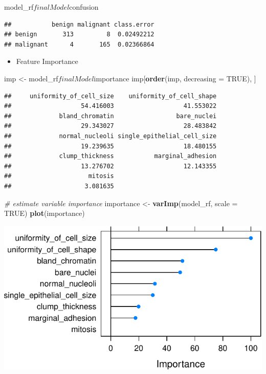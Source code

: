 \documentclass[]{article}
\newenvironment{Shaded}{\begin{snugshade}}{\end{snugshade}}
\newcommand{\KeywordTok}[1]{\textcolor[rgb]{0.13,0.29,0.53}{\textbf{{#1}}}}
\newcommand{\DataTypeTok}[1]{\textcolor[rgb]{0.13,0.29,0.53}{{#1}}}
\newcommand{\StringTok}[1]{\textcolor[rgb]{0.31,0.60,0.02}{{#1}}}
\newcommand{\CommentTok}[1]{\textcolor[rgb]{0.56,0.35,0.01}{\textit{{#1}}}}
\newcommand{\OtherTok}[1]{\textcolor[rgb]{0.56,0.35,0.01}{{#1}}}
\newcommand{\NormalTok}[1]{{#1}}
\providecommand{\tightlist}{%
  \setlength{\itemsep}{0pt}\setlength{\parskip}{0pt}}
\begin{document}
\begin{Shaded}
\begin{Highlighting}[]
\NormalTok{model_rf$finalModel$confusion}
\end{Highlighting}
\end{Shaded}

\begin{verbatim}
##           benign malignant class.error
## benign       313         8  0.02492212
## malignant      4       165  0.02366864
\end{verbatim}

\begin{itemize}
\tightlist
\item
  Feature Importance
\end{itemize}

\begin{Shaded}
\begin{Highlighting}[]
\NormalTok{imp <-}\StringTok{ }\NormalTok{model_rf$finalModel$importance}
\NormalTok{imp[}\KeywordTok{order}\NormalTok{(imp, }\DataTypeTok{decreasing =} \OtherTok{TRUE}\NormalTok{), ]}
\end{Highlighting}
\end{Shaded}

\begin{verbatim}
##     uniformity_of_cell_size    uniformity_of_cell_shape 
##                   54.416003                   41.553022 
##             bland_chromatin                 bare_nuclei 
##                   29.343027                   28.483842 
##             normal_nucleoli single_epithelial_cell_size 
##                   19.239635                   18.480155 
##             clump_thickness           marginal_adhesion 
##                   13.276702                   12.143355 
##                     mitosis 
##                    3.081635
\end{verbatim}

\begin{Shaded}
\begin{Highlighting}[]
\CommentTok{# estimate variable importance}
\NormalTok{importance <-}\StringTok{ }\KeywordTok{varImp}\NormalTok{(model_rf, }\DataTypeTok{scale =} \OtherTok{TRUE}\NormalTok{)}
\KeywordTok{plot}\NormalTok{(importance)}
\end{Highlighting}
\end{Shaded}

\includegraphics{webinar_code_files/figure-latex/importance_rf-1.pdf}
\end{document}
